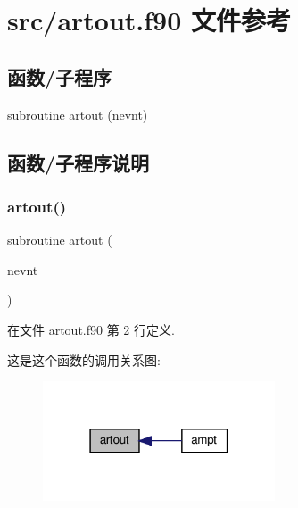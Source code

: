 \hypertarget{artout_8f90}{}\section{src/artout.f90 文件参考}
\label{artout_8f90}
\subsection*{函数/子程序}
\begin{DoxyCompactItemize}
\item 
subroutine \mbox{\hyperlink{artout_8f90_abf90c43c7007e2ea1969e07a18328d02}{artout}} (nevnt)
\end{DoxyCompactItemize}


\subsection{函数/子程序说明}
\mbox{\label{artout_8f90_abf90c43c7007e2ea1969e07a18328d02}} 
\subsubsection{\texorpdfstring{artout()}{artout()}}
{\footnotesize\ttfamily subroutine artout (\begin{DoxyParamCaption}\item[{}]{nevnt }\end{DoxyParamCaption})}



在文件 artout.\+f90 第 2 行定义.

这是这个函数的调用关系图\+:
\nopagebreak
\begin{figure}[H]
\begin{center}
\leavevmode
\includegraphics[width=195pt]{artout_8f90_abf90c43c7007e2ea1969e07a18328d02_icgraph}
\end{center}
\end{figure}
